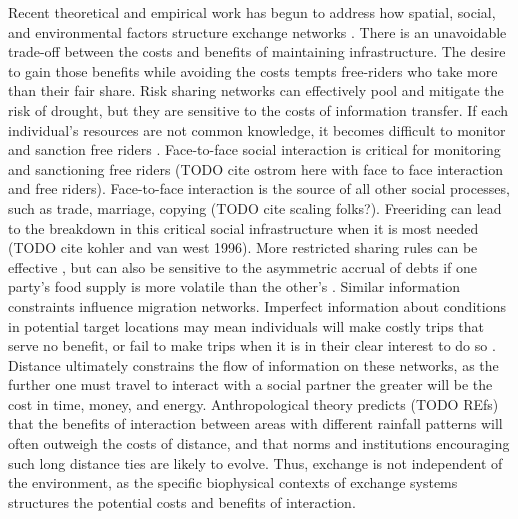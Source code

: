 \documentclass[11pt]{wlscirep}
\begin{document}
Recent theoretical and empirical work has begun to address how spatial, social, and environmental factors structure exchange networks \cite{Nolin2010Food-SharingIndonesia,Koster2014,Hao2015,Schnegg2015}. There is an unavoidable trade-off between the costs and benefits of maintaining infrastructure. The desire to gain those benefits while avoiding the costs tempts free-riders who take more than their fair share. Risk sharing networks can effectively pool and mitigate the risk of drought, but they are sensitive to the costs of information transfer. If each individual's resources are not common knowledge, it becomes difficult to monitor and sanction free riders \cite{Hao2015a}. Face-to-face social interaction is critical for monitoring and sanctioning free riders (TODO cite ostrom here with face to face interaction and free riders). Face-to-face interaction is the source of all other social processes, such as trade, marriage, copying (TODO cite scaling folks?). Freeriding can lead to the breakdown in this critical social infrastructure when it is most needed (TODO cite kohler and van west 1996). More restricted sharing rules can be effective \cite{Hegmon1996}, but can also be sensitive to the asymmetric accrual of debts if one party's food supply is more volatile than the other's \cite{Crabtree2015}. Similar information constraints influence migration networks. Imperfect information about conditions in potential target locations may mean individuals will make costly trips that serve no benefit, or fail to make trips when it is in their clear interest to do so \cite{Anderies2011a}. Distance ultimately constrains the flow of information on these networks, as the further one must travel to interact with a social partner the greater will be the cost in time, money, and energy. Anthropological theory predicts (TODO REfs) that the benefits of interaction between areas with different rainfall patterns will often outweigh the costs of distance, and that norms and institutions encouraging such long distance ties are likely to evolve. Thus, exchange is not independent of the environment, as the specific biophysical contexts of exchange systems structures the potential costs and benefits of interaction.
\end{document}
